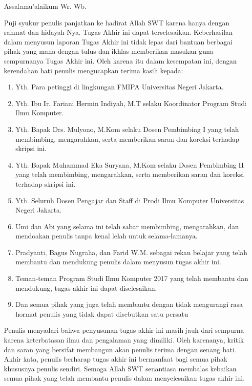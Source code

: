 \preface
Assalamu'alaikum Wr. Wb.

\vspace{0.5cm}

Puji syukur penulis panjatkan ke hadirat Allah SWT karena hanya dengan rahmat dan hidayah-Nya, Tugas Akhir ini dapat terselesaikan. Keberhasilan dalam menyusun laporan Tugas Akhir ini tidak lepas dari bantuan berbagai pihak yang mana dengan tulus dan ikhlas memberikan masukan guna sempurnanya Tugas Akhir ini. Oleh karena itu dalam kesempatan ini, dengan kerendahan hati penulis mengucapkan terima kasih kepada:

\begin{enumerate}
	\item{Yth. Para petinggi di lingkungan FMIPA Universitas Negeri Jakarta.}
	\item{Yth. Ibu Ir. Fariani Hermin Indiyah, M.T selaku Koordinator Program Studi Ilmu Komputer.}
	\item{Yth. Bapak Drs. Mulyono, M.Kom selaku Dosen Pembimbing I yang telah membimbing, mengarahkan, serta memberikan saran dan koreksi terhadap skripsi ini.}
	\item{Yth. Bapak Muhammad Eka Suryana, M.Kom selaku Dosen Pembimbing II yang telah membimbing, mengarahkan, serta memberikan saran dan koreksi terhadap skripsi ini.}
	\item{Yth. Seluruh Dosen Pengajar dan Staff di Prodi Ilmu Komputer Universitas Negeri Jakarta.}
	\item{Umi dan Abi yang selama ini telah sabar membimbing, mengarahkan, dan mendoakan penulis tanpa kenal lelah untuk selama-lamanya.}
	\item{Pradyanti, Bagus Nugraha, dan Farid W.M. sebagai rekan belajar yang telah membantu dan mendukung penulis dalam menyusun tugas akhir ini.}
	\item{Teman-teman Program Studi Ilmu Komputer 2017 yang telah membantu dan mendukung, tugas akhir ini dapat diselesaikan.}
	\item{Dan semua pihak yang juga telah membantu dengan tidak mengurangi rasa hormat penulis yang tidak dapat disebutkan satu persatu}
\end{enumerate}

Penulis menyadari bahwa penyusunan tugas akhir ini masih jauh dari sempurna karena keterbatasan ilmu dan pengalaman yang dimiliki. Oleh karenanya, kritik dan saran yang bersifat membangun akan penulis terima dengan senang hati. Akhir kata, penulis berharap tugas akhir ini bermanfaat bagi semua pihak khususnya penulis sendiri. Semoga Allah SWT senantiasa membalas kebaikan semua pihak yang telah membantu penulis dalam menyelesaikan tugas akhir ini.

